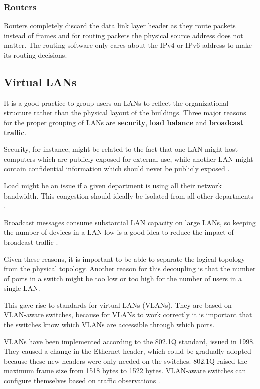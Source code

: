 \subsubsection{Routers}

Routers completely discard the data link layer header as they route packets instead of frames and for routing packets the physical source address does not matter.
The routing software only cares about the IPv4 or IPv6 address to make its routing decisions.

\subsection{Virtual LANs}

It is a good practice to group users on LANs to reflect the organizational structure rather than the physical layout of the buildings. Three major reasons for the proper grouping of LANs are \textbf{security}, \textbf{load balance} and \textbf{broadcast traffic}.

Security, for instance, might be related to the fact that one LAN might host computers which are publicly exposed for external use, while another LAN might contain confidential information which should never be publicly exposed  \cite[p.~343]{computer-networks-tanenbaum-2012}.

Load might be an issue if a given department is using all their network bandwidth. This congestion should ideally be isolated from all other departments \cite[p.~344]{computer-networks-tanenbaum-2012}.

Broadcast messages consume substantial LAN capacity on large LANs, so keeping the number of devices in a LAN low is a good idea to reduce the impact of broadcast traffic \cite[p.~344]{computer-networks-tanenbaum-2012}.

Given these reasons, it is important to be able to separate the logical topology from the physical topology.
Another reason for this decoupling is that the number of ports in a switch might be too low or too high for the number of users in a single LAN.

This gave rise to standards for virtual LANs (VLANs). They are based on VLAN-aware switches, because for VLANs to work correctly it is important that the switches know which VLANs are accessible through which ports.

VLANs have been implemented according to the 802.1Q standard, issued in 1998. They caused a change in the Ethernet header, which could be gradually adopted because these new headers were only needed on the switches. 802.1Q raised the maximum frame size from 1518 bytes to 1522 bytes. VLAN-aware switches can configure themselves based on traffic observations \cite[p.~348]{computer-networks-tanenbaum-2012}.

